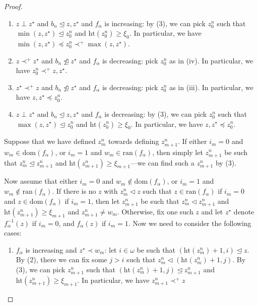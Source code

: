 \documentclass[10pt,a4paper]{amsart}
\begin{document}
\begin{proof}
\begin{enumerate}[label={(\roman*)}]
\item $z \perp z^\star$ and $b_n \unlhd z, z^\star$ and $f_\alpha$ is increasing:
\newline by (3), we can pick $z_0^n$ such that $\min (z,z^\star) \unlhd z_0^n$ and $\mathrm{ht}(z_0^n) \ge \xi_0$. In particular, we have $\min (z,z^\star) \preceq z_0^n \prec^+ \max (z,z^\star)$.


\item $z \prec^+ z^\star$ and $b_n \not\trianglelefteq z^\star$ and $f_\alpha$ is decreasing:
\newline pick $z_0^n$ as in (iv). In particular, we have $z_0^n \prec^+ z,z^\star$.


\item $z^\star \prec^+ z$ and $b_n \not\trianglelefteq z^\star$ and $f_\alpha$ is decreasing:
\newline pick $z_0^n$ as in (iii). In particular, we have $z,z^\star \preceq z_0^n$.


\item $z \perp z^\star$ and $b_n \unlhd z, z^\star$ and $f_\alpha$ is decreasing:
\newline by (3), we can pick $z_0^n$ such that $\max (z,z^\star) \unlhd z_0^n$ and $\mathrm{ht}(z_0^n) \ge \xi_0$. In particular, we have $z,z^\star \preceq z_0^n$.
\end{enumerate}




Suppose that we have defined $z_m^n$ towards defining $z_{m+1}^n$. If either $i_m = 0$ and $w_m \in \mathrm{dom}(f_\alpha)$, or $i_m = 1$ and $w_m \in \mathrm{ran}(f_\alpha)$, then simply let $z_{m+1}^n$ be such that $z_{m}^n \unlhd z_{m+1}^n$ and $\mathrm{ht}(z_{m+1}^n) \ge \xi_{m+1}$---we can find such a $z_{m+1}^n$ by (3). 

Now assume that either $i_m = 0$ and $w_m \not\in \mathrm{dom}(f_\alpha)$, or $i_m = 1$ and $w_m \not\in \mathrm{ran}(f_\alpha)$. If there is no $z$ with $z_m^n \lhd z$ such that $z \in \mathrm{ran}(f_\alpha)$ if $i_m = 0$ and $z \in \mathrm{dom}(f_\alpha)$ if $i_m = 1$, then let $z_{m+1}^n$ be such that $z_m^n \lhd z_{m+1}^n$ and $\mathrm{ht}(z_{m+1}^n) \ge \xi_{m+1}$ and $z_{m+1}^n \neq w_m$. Otherwise, fix one such $z$ and let $z^\star$ denote $f^{-1}_\alpha(z)$ if $i_m  = 0$, and $f_\alpha(z)$ if $i_m = 1$. Now we need to consider the following cases:
\begin{enumerate}[label={(\alph*)}]
\itemsep0.3em
\item $f_\alpha$ is increasing and $z^\star \prec w_m$:
\newline let $i \in \omega$ be such that $(\mathrm{ht}(z_m^n)+1, i) \unlhd z$. By (2), there we can fix some $j > i$ such that $z_m^n \lhd (\mathrm{ht}(z_m^n)+1, j)$. By (3), we can pick $z_{m+1}^n$ such that $(\mathrm{ht}(z_m^n)+1, j) \unlhd z_{m+1}^n$ and $\mathrm{ht}(z_{m+1}^n) \ge \xi_{m+1}$. In particular, we have $z_{m+1}^n \prec^+ z$



\end{enumerate}
\end{proof}
\end{document}
